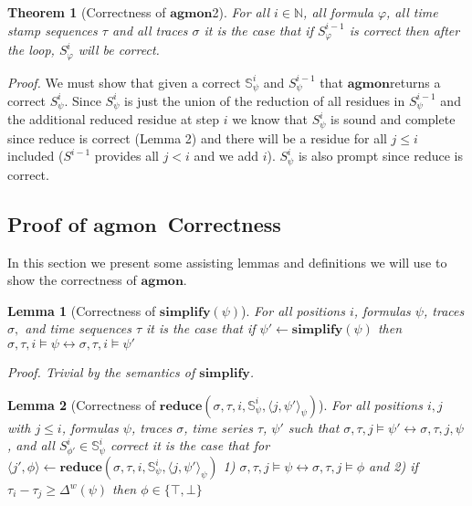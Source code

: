 \documentclass[10pt,a4paper]{article}
\newcommand{\rp}[2]{\ensuremath{\langle #1, #2 \rangle}}
\newcommand{\agmon}{\ensuremath{\mathbf{agmon}}}
\newcommand{\rpt}[3]{\ensuremath{\langle #1, #2 \rangle}_{#3}}
\newtheorem{thm}{Theorem}
\newtheorem{lemma}{Lemma}
\begin{document}
\begin{thm}[Correctness of \agmon 2]
For all $i \in \mathbb{N}$, all formula $\varphi$, all time stamp sequences $\tau$ and all traces $\sigma$ it is the case that if $S^{i-1}_{\varphi}$ is correct then after the loop, $S^{i}_{\varphi}$ will be correct.
\end{thm}
\textit{Proof.} We must show that given a correct $\mathbb{S}^i_{\psi}$ and $S^{i-1}_{\psi}$ that \agmon returns a correct $S^i_{\psi}$. Since $S^i_{\psi}$ is just the union of the reduction of all residues in $S^{i-1}_{\psi}$ and the additional reduced residue at step $i$ we know that $S^i_{\psi}$ is sound and complete since reduce is correct (Lemma 2) and there will be a residue for all $j \leq i$ included ($S^{i-1}$ provides all $j < i$ and we add $i$). $S^i_{\psi}$ is also prompt since reduce is correct.

\subsection{Proof of \agmon\ Correctness}
In this section we present some assisting lemmas and definitions we will use to show the correctness of \agmon.

\begin{lemma}[Correctness of $\mathbf{simplify}(\psi)$] For all positions $i$, formulas $\psi$, traces $\sigma,$ and time sequences $\tau$ 
it is the case that if $\psi' \leftarrow \mathbf{simplify}(\psi)$ then $\sigma, \tau, i \vDash \psi \leftrightarrow \sigma, \tau, i \vDash \psi'$

Proof. Trivial by the semantics of $\mathbf{simplify}$.
\end{lemma}

\begin{lemma}[Correctness of $\mathbf{reduce}(\sigma, \tau, i, \mathbb{S}^i_{\psi}, \rpt{j}{\psi'}{\psi})$]
For all positions $i,j$ with $j \leq i$, formulas $\psi$, traces $\sigma$, time series $\tau$, $\psi'$ such that 
$\sigma, \tau, j \vDash \psi' \leftrightarrow \sigma, \tau, j, \psi$, and all $S^i_{\phi'} \in \mathbb{S}^i_{\psi}$ correct it is the case that
for $\rp{j'}{\phi} \leftarrow \mathbf{reduce}(\sigma, \tau, i, \mathbb{S}^i_{\psi}, \rpt{j}{\psi'}{\psi})$ 
1) $\sigma, \tau, j \vDash \psi \leftrightarrow \sigma, \tau, j \vDash \phi$ and
2) if $\tau_i - \tau_j \geq \Delta^w(\psi)$ then $\phi \in \{\top, \bot\}$
\end{lemma}
\end{document}
